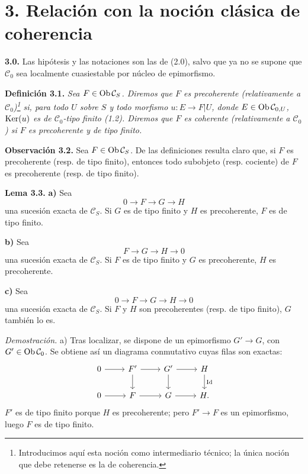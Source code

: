 \providecommand{\sisi}[2]{#2}

\section*{3. Relación con la noción clásica de coherencia}

\textbf{3.0.} Las hipótesis y las notaciones son las de (2.0), salvo que ya no se supone que \(\mathcal C_0\) sea localmente cuasiestable por núcleo de epimorfismo.

\textbf{Definición 3.1.} \emph{Sea \(F\in\operatorname{Ob}\mathcal C_S\). Diremos que \(F\) es precoherente (relativamente a \(\mathcal C_0\))\footnote{Introducimos aquí esta noción como intermediario técnico; la única noción que debe retenerse es la de coherencia.} si, para todo \(U\) sobre \(S\) y todo morfismo \(u:E\to F|U\), donde \(E\in\operatorname{Ob}\mathcal C_{0,U}\), \(\operatorname{Ker}(u)\) es de \(\mathcal C_0\)-tipo finito (1.2). Diremos que \(F\) es coherente (relativamente a \(\mathcal C_0\)) si \(F\) es precoherente y de tipo finito.}

\textbf{Observación 3.2.} Sea \(F\in\operatorname{Ob}\mathcal C_S\). De las definiciones resulta claro que, si \(F\) es precoherente (resp. de tipo finito), entonces todo subobjeto (resp. cociente) de \(F\) es precoherente (resp. de tipo finito).

\textbf{Lema 3.3.} \textbf{a)} Sea
\[
  0\longrightarrow F\longrightarrow G\longrightarrow H
\]
una sucesión exacta de \(\mathcal C_S\). Si \(G\) es de tipo finito y \(H\) es precoherente, \(F\) es de tipo finito.

\textbf{b)} Sea
\[
  F\longrightarrow G\longrightarrow H\longrightarrow 0
\]
una sucesión exacta de \(\mathcal C_S\). Si \(F\) es de tipo finito y \(G\) es precoherente, \(H\) es precoherente.

\textbf{c)} Sea
\[
  0\longrightarrow F\longrightarrow G\longrightarrow H\longrightarrow 0
\]
una sucesión exacta de \(\mathcal C_S\). Si \(F\) y \(H\) son precoherentes (resp. de tipo finito), \(G\) también lo es.

\emph{Demostración.} a) Tras localizar, se dispone de un epimorfismo \(G'\to G\), con \(G'\in\operatorname{Ob}\mathcal C_0\). Se obtiene así un diagrama conmutativo cuyas filas son exactas:
\[
\begin{tikzcd}
0\arrow[r]&F'\arrow[r]\arrow[d]&G'\arrow[r]\arrow[d]&H\arrow[d,"\Id"]\\
0\arrow[r]&F\arrow[r]&G\arrow[r]&H .
\end{tikzcd}
\]
\(F'\) es de tipo finito porque \(H\) es precoherente; pero \(F'\to F\) es un epimorfismo, luego \(F\) es de tipo finito.

